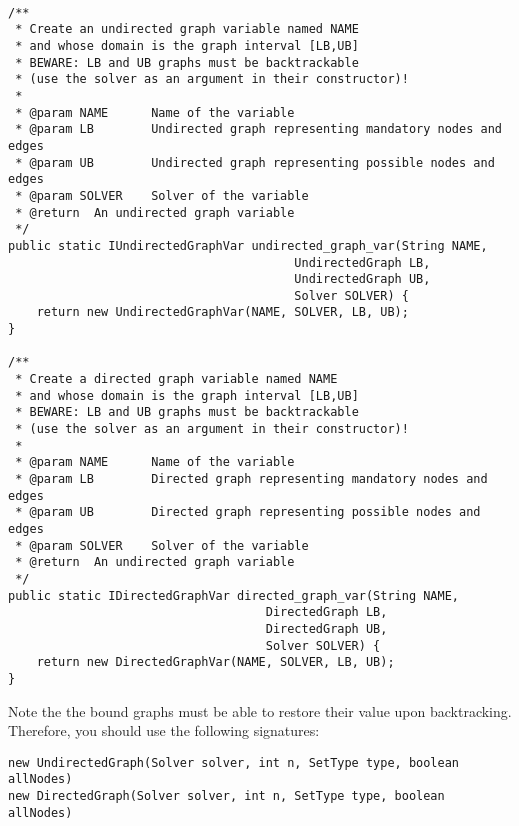 \documentclass{article}
\begin{document}
\begin{lstlisting}

/**
 * Create an undirected graph variable named NAME
 * and whose domain is the graph interval [LB,UB]
 * BEWARE: LB and UB graphs must be backtrackable 
 * (use the solver as an argument in their constructor)!
 *
 * @param NAME		Name of the variable
 * @param LB		Undirected graph representing mandatory nodes and edges
 * @param UB		Undirected graph representing possible nodes and edges
 * @param SOLVER	Solver of the variable
 * @return	An undirected graph variable
 */
public static IUndirectedGraphVar undirected_graph_var(String NAME, 
										UndirectedGraph LB, 
										UndirectedGraph UB, 
										Solver SOLVER) {
	return new UndirectedGraphVar(NAME, SOLVER, LB, UB);
}

/**
 * Create a directed graph variable named NAME
 * and whose domain is the graph interval [LB,UB]
 * BEWARE: LB and UB graphs must be backtrackable 
 * (use the solver as an argument in their constructor)!
 *
 * @param NAME		Name of the variable
 * @param LB		Directed graph representing mandatory nodes and edges
 * @param UB		Directed graph representing possible nodes and edges
 * @param SOLVER	Solver of the variable
 * @return	An undirected graph variable
 */
public static IDirectedGraphVar directed_graph_var(String NAME, 
									DirectedGraph LB, 
									DirectedGraph UB, 
									Solver SOLVER) {
	return new DirectedGraphVar(NAME, SOLVER, LB, UB);
}
\end{lstlisting}

Note the the bound graphs must be able to restore their value upon backtracking. 
Therefore, you should use the following signatures:
\begin{lstlisting}
new UndirectedGraph(Solver solver, int n, SetType type, boolean allNodes)
new DirectedGraph(Solver solver, int n, SetType type, boolean allNodes)
\end{lstlisting}
\end{document}
